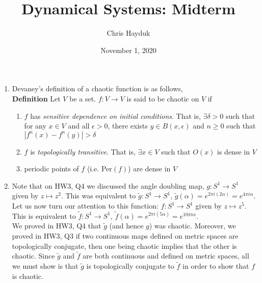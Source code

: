 \documentclass[12pt]{article}
\newenvironment{problem}[2][Problem]{\begin{trivlist}
\item[\hskip \labelsep {\bfseries #1}\hskip \labelsep {\bfseries #2.}]}{\end{trivlist}}
\begin{document}
\title{Dynamical Systems: Midterm}

\author{Chris Hayduk}
\date{November 1, 2020}

\maketitle

\begin{problem}{1}
\end{problem}

\begin{enumerate}[label=(\alph*)]

\item Devaney's definition of a chaotic function is as follows,\\

\textbf{Definition} Let $V$ be a set. $f: V \to V$ is said to be chaotic on $V$ if
\begin{enumerate}

\item $f$ has \textit{sensitive dependence on initial conditions}. That is, $\exists \delta > 0$ such that for any $x \in V$ and all $\epsilon > 0$, there exists $y \in B(x, \epsilon)$ and $n \geq 0$ such that $|f^n(x) - f^n(y)| > \delta$ 

\item $f$ is \textit{topologically transitive}. That is, $\exists x \in V$ such that $O(x)$ is dense in $V$

\item periodic points of $f$ (i.e. Per$(f)$) are dense in $V$

\end{enumerate}


\item Note that on HW3, Q4 we discussed the angle doubling map, $g: S^1 \to S^1$ given by $z \mapsto z^2$. This was equivalent to $\tilde{g}: S^1 \to S^1$, $\tilde{g}(\alpha) = e^{2\pi i (2\alpha)} = e^{4\pi i \alpha}$.\\

Let us now turn our attention to this function: $f: S^1 \to S^1$ given by $z \mapsto z^5$. This is equivalent to $\tilde{f}: S^1 \to S^1$, $\tilde{f}(\alpha) = e^{2\pi i (5\alpha)} = e^{10\pi i \alpha}$.\\

We proved in HW3, Q4 that $\tilde{g}$ (and hence $g$) was chaotic. Moreover, we proved in HW3, Q3 if two continuous maps defined on metric spaces are topologically conjugate, then one being chaotic implies that the other is chaotic. Since $\tilde{g}$ and $\tilde{f}$ are both continuous and defined on metric spaces, all we must show is that $\tilde{g}$ is topologically conjugate to $\tilde{f}$ in order to show that $f$ is chaotic.\\


\end{enumerate}
\end{document}
